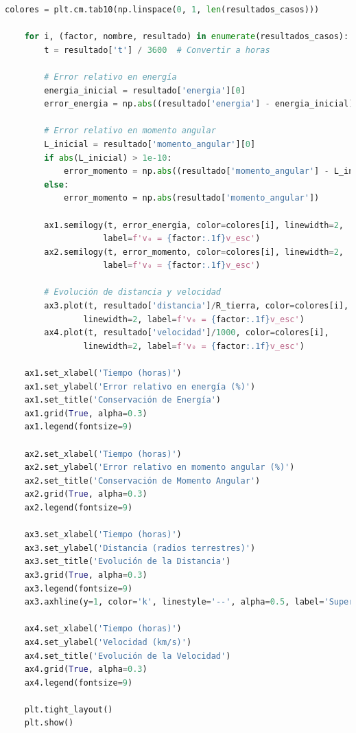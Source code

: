 \documentclass{article}
\begin{document}
\begin{lstlisting}[language=Python, caption={Análisis completo del sistema Tierra-nave}]
    colores = plt.cm.tab10(np.linspace(0, 1, len(resultados_casos)))
    
    for i, (factor, nombre, resultado) in enumerate(resultados_casos):
        t = resultado['t'] / 3600  # Convertir a horas
        
        # Error relativo en energía
        energia_inicial = resultado['energia'][0]
        error_energia = np.abs((resultado['energia'] - energia_inicial) / energia_inicial) * 100
        
        # Error relativo en momento angular
        L_inicial = resultado['momento_angular'][0]
        if abs(L_inicial) > 1e-10:
            error_momento = np.abs((resultado['momento_angular'] - L_inicial) / L_inicial) * 100
        else:
            error_momento = np.abs(resultado['momento_angular'])
        
        ax1.semilogy(t, error_energia, color=colores[i], linewidth=2, 
                    label=f'v₀ = {factor:.1f}v_esc')
        ax2.semilogy(t, error_momento, color=colores[i], linewidth=2,
                    label=f'v₀ = {factor:.1f}v_esc')
        
        # Evolución de distancia y velocidad
        ax3.plot(t, resultado['distancia']/R_tierra, color=colores[i], 
                linewidth=2, label=f'v₀ = {factor:.1f}v_esc')
        ax4.plot(t, resultado['velocidad']/1000, color=colores[i], 
                linewidth=2, label=f'v₀ = {factor:.1f}v_esc')
    
    ax1.set_xlabel('Tiempo (horas)')
    ax1.set_ylabel('Error relativo en energía (%)')
    ax1.set_title('Conservación de Energía')
    ax1.grid(True, alpha=0.3)
    ax1.legend(fontsize=9)
    
    ax2.set_xlabel('Tiempo (horas)')
    ax2.set_ylabel('Error relativo en momento angular (%)')
    ax2.set_title('Conservación de Momento Angular')
    ax2.grid(True, alpha=0.3)
    ax2.legend(fontsize=9)
    
    ax3.set_xlabel('Tiempo (horas)')
    ax3.set_ylabel('Distancia (radios terrestres)')
    ax3.set_title('Evolución de la Distancia')
    ax3.grid(True, alpha=0.3)
    ax3.legend(fontsize=9)
    ax3.axhline(y=1, color='k', linestyle='--', alpha=0.5, label='Superficie')
    
    ax4.set_xlabel('Tiempo (horas)')
    ax4.set_ylabel('Velocidad (km/s)')
    ax4.set_title('Evolución de la Velocidad')
    ax4.grid(True, alpha=0.3)
    ax4.legend(fontsize=9)
    
    plt.tight_layout()
    plt.show()


\end{lstlisting}
\end{document}
